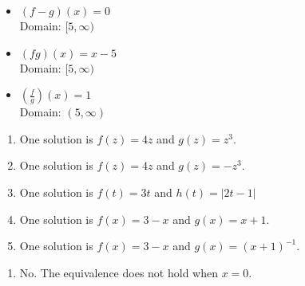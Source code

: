 \begin{enumerate}
\begin{multicols}{2}
\begin{itemize}
      \vfill
      
      \columnbreak
      
\item $(f-g)(x) =0$ \\
       Domain: $[5,\infty)$


\end{itemize}

\end{multicols}

\begin{multicols}{2}

\begin{itemize}

\item $(fg)(x) =x-5$ \\
       Domain: $[5,\infty)$
      
      \vfill
      
      \columnbreak
      
\item $\left(\frac{f}{g}\right)(x) =1$ \\
       Domain: $(5,\infty)$


\end{itemize}

\end{multicols}

\setcounter{HW}{\value{enumi}}
\end{enumerate}

\newpage

\begin{enumerate}
\setcounter{enumi}{\value{HW}}

\item One solution is $f(z) = 4z$ and $g(z) = z^3$. 
\item One solution is $f(z) = 4z$ and $g(z) = - z^3$. 
\item One solution is  $f(t) = 3t$ and $h(t) = |2t-1|$ 
\item One solution is $f(x) = 3-x$ and $g(x) = x+1$.  
\item  One solution is $f(x) = 3-x$ and $g(x) = (x+1)^{-1}$.  

\setcounter{HW}{\value{enumi}}
\end{enumerate}

\begin{enumerate}
\setcounter{enumi}{\value{HW}}

\item No.  The equivalence does not hold when $x = 0$.

\setcounter{HW}{\value{enumi}}
\end{enumerate}

